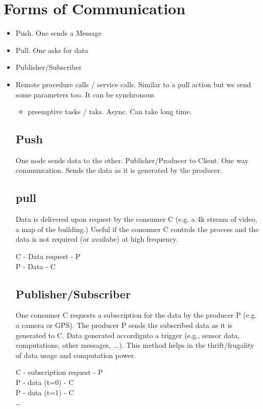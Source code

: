 \documentclass[]{report}
\begin{document}
\section*{Forms of Communication}
    \begin{itemize}
        \item Push. One sends a Message
        \item Pull. One asks for data
        \item Publisher/Subscriber
        \item Remote procedure calls / service calls. Similar to a pull action but we send some parameters too. It can be synchronous.
        \begin{itemize}
            \item  preemptive tasks / taks. Async. Can take long time.
        \end{itemize}
        \subsection*{Push}
        One node sends data to the other. Publisher/Producer to Client. One way communcation. Sends the data as it is generated by the producer.
        \subsection*{pull}
        Data is delivered upon request by the consumer C (e.g. a 4k stream of video, a map of the building.)
        Useful if the consumer C controls the process and the data is not required (or availabe) at high frequency.

        C - Data request - P \\
        P - Data - C

        \subsection*{Publisher/Subscriber}
        One consumer C requests a subscription for the data by the producer P (e.g. a camera or GPS). The producer P sends the subscribed data as it is generated to C.
        Data generated accordignto a trigger (e.g., sensor data, computations, other messages, ...). This method helps in the thrift/frugality of data usage and computation power.

        C - subscription request - P \\
        P - data (t=0) - C \\
        P - data (t=1) - C \\
        \dots
        
    \end{itemize}
\end{document}
